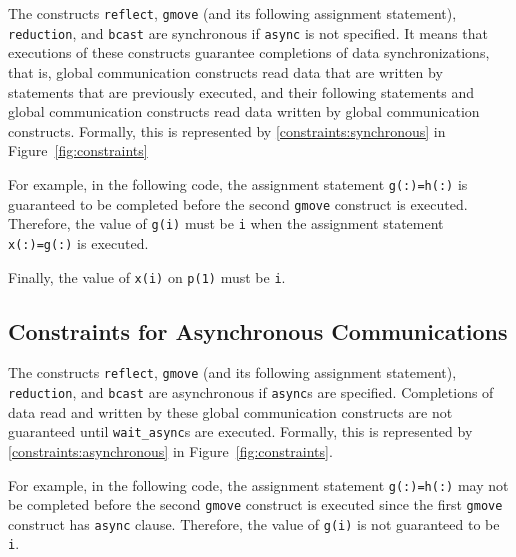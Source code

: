 The constructs \texttt{reflect}, \texttt{gmove} (and its following
assignment statement), \texttt{reduction}, and \texttt{bcast} are
synchronous if \texttt{async} is not specified.  It means that
executions of these constructs guarantee completions of data
synchronizations, that is, global communication constructs read data
that are written by statements that are previously executed, and their
following statements and global communication constructs read data
written by global communication constructs.  Formally, this is
represented by \ref{constraints:synchronous} in
Figure~\ref{fig:constraints}

For example, in the following code, the assignment statement
\texttt{g(:)=h(:)} is guaranteed to be completed before the second
\texttt{gmove} construct is executed.  Therefore, the value of
\texttt{g(i)} must be \texttt{i} when the assignment statement
\texttt{x(:)=g(:)} is executed.

Finally, the value of \texttt{x(i)} on \texttt{p(1)} must be
\texttt{i}.

\begin{center}
\end{center}

\subsection{Constraints for Asynchronous Communications}

The constructs \texttt{reflect}, \texttt{gmove} (and its following
assignment statement), \texttt{reduction}, and \texttt{bcast} are
asynchronous if \texttt{async}s are specified.  Completions of data
read and written by these global communication constructs are not
guaranteed until \texttt{wait\_async}s are executed.
Formally, this is represented by
\ref{constraints:asynchronous} in Figure~\ref{fig:constraints}.

For example, in the following code, the assignment statement
\texttt{g(:)=h(:)} may not be completed before the second
\texttt{gmove} construct is executed since the first \texttt{gmove}
construct has \texttt{async} clause.  Therefore, the value of
\texttt{g(i)} is not guaranteed to be \texttt{i}.

